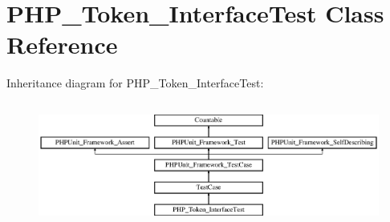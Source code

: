 \hypertarget{class_p_h_p___token___interface_test}{}\section{P\+H\+P\+\_\+\+Token\+\_\+\+Interface\+Test Class Reference}
\label{class_p_h_p___token___interface_test}
Inheritance diagram for P\+H\+P\+\_\+\+Token\+\_\+\+Interface\+Test\+:\begin{figure}[H]
\begin{center}
\leavevmode
\includegraphics[height=4.129793cm]{class_p_h_p___token___interface_test}
\end{center}
\end{figure}
